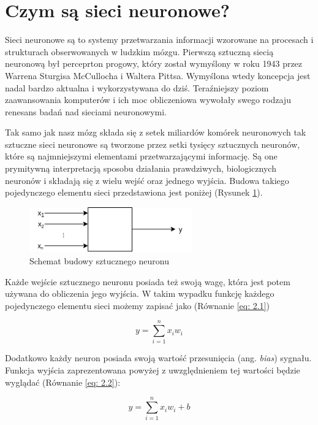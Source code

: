 \documentclass[12pt, oneside, a4paper]{report}
\begin{document}
\section{Czym są sieci neuronowe?}

Sieci neuronowe są to systemy przetwarzania informacji wzorowane na procesach i strukturach obserwowanych w ludzkim mózgu. Pierwszą sztuczną siecią neuronową był perceprton progowy, który został wymyślony w roku 1943 przez Warrena Sturgisa McCullocha i Waltera Pittsa. Wymyślona wtedy koncepcja jest nadal bardzo aktualna i wykorzystywana do dziś. Teraźniejszy poziom zaawansowania komputerów i ich moc obliczeniowa wywołały swego rodzaju renesans badań nad sieciami neuronowymi.

Tak samo jak nasz mózg składa się z setek miliardów komórek neuronowych tak sztuczne sieci neuronowe są tworzone przez setki tysięcy sztucznych neuronów, które są najmniejszymi elementami przetwarzającymi informację. Są one prymitywną interpretacją sposobu działania prawdziwych, biologicznych neuronów i składają się z wielu wejść oraz jednego wyjścia. Budowa takiego pojedynczego elementu sieci przedstawiona jest poniżej (Rysunek \ref{fig: 2.1}).

\begin{figure}[h]
	\centering
	\includegraphics[width=7cm]{fig211.png}
	\caption{Schemat budowy sztucznego neuronu}
	\label{fig: 2.1}
\end{figure}

Każde wejście sztucznego neuronu posiada też swoją wagę, która jest potem używana do obliczenia jego wyjścia. W takim wypadku funkcję każdego pojedynczego elementu sieci możemy zapisać jako (Równanie \ref{eq: 2.1})

\begin{equation}\label{eq: 2.1}
y = \sum^{n}_{i=1} x_{i}w_{i}
\end{equation}

Dodatkowo każdy neuron posiada swoją wartość przesunięcia (ang. \textit{bias}) sygnału. Funkcja wyjścia zaprezentowana powyżej z uwzględnieniem tej wartości będzie wyglądać (Równanie \ref{eq: 2.2}):

\begin{equation}\label{eq: 2.2}
  y = \sum^{n}_{i=1} x_{i}w_{i} + b
\end{equation}
\end{document}
